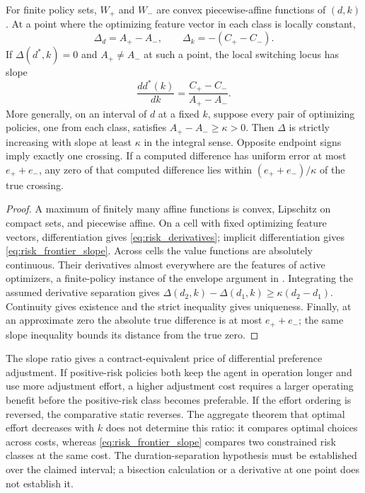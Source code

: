 \begin{proposition}
\label{prop:risk_frontier}
For finite policy sets, $W_+$ and $W_-$ are convex piecewise-affine functions of $(d,k)$. At a point where the optimizing feature vector in each class is locally constant,
\begin{equation}
 \Delta_d=A_+-A_-,\qquad \Delta_k=-(C_+-C_-).
 \label{eq:risk_derivatives}
\end{equation}
If $\Delta(d^*,k)=0$ and $A_+\ne A_-$ at such a point, the local switching locus has slope
\begin{equation}
 \frac{d d^*(k)}{dk}=\frac{C_+-C_-}{A_+-A_-}.
 \label{eq:risk_frontier_slope}
\end{equation}
More generally, on an interval of $d$ at a fixed $k$, suppose every pair of optimizing policies, one from each class, satisfies $A_+-A_-\geq\kappa>0$. Then $\Delta$ is strictly increasing with slope at least $\kappa$ in the integral sense. Opposite endpoint signs imply exactly one crossing. If a computed difference has uniform error at most $e_++e_-$, any zero of that computed difference lies within $(e_++e_-)/\kappa$ of the true crossing.
\end{proposition}
\begin{proof}
A maximum of finitely many affine functions is convex, Lipschitz on compact sets, and piecewise affine. On a cell with fixed optimizing feature vectors, differentiation gives \eqref{eq:risk_derivatives}; implicit differentiation gives \eqref{eq:risk_frontier_slope}. Across cells the value functions are absolutely continuous. Their derivatives almost everywhere are the features of active optimizers, a finite-policy instance of the envelope argument in \citet{milgrom2002}. Integrating the assumed derivative separation gives
$\Delta(d_2,k)-\Delta(d_1,k)\geq\kappa(d_2-d_1)$. Continuity gives existence and the strict inequality gives uniqueness. Finally, at an approximate zero the absolute true difference is at most $e_++e_-$; the same slope inequality bounds its distance from the true zero.
\end{proof}

The slope ratio gives a contract-equivalent price of differential preference adjustment. If positive-risk policies both keep the agent in operation longer and use more adjustment effort, a higher adjustment cost requires a larger operating benefit before the positive-risk class becomes preferable. If the effort ordering is reversed, the comparative static reverses. The aggregate theorem that optimal effort decreases with $k$ does not determine this ratio: it compares optimal choices across costs, whereas \eqref{eq:risk_frontier_slope} compares two constrained risk classes at the same cost. The duration-separation hypothesis must be established over the claimed interval; a bisection calculation or a derivative at one point does not establish it.

